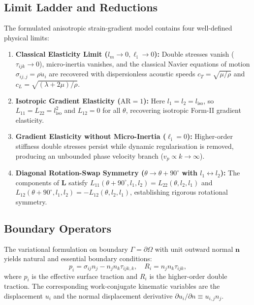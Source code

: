 \subsection{Limit Ladder and Reductions}
The formulated anisotropic strain-gradient model contains four well-defined physical limits:
\begin{enumerate}[label=(\roman*)]
  \item \textbf{Classical Elasticity Limit ($l_m \to 0, \ell_{\mathrm{i}} \to 0$):} Double stresses vanish ($\tau_{ijk} \to 0$), micro-inertia vanishes, and the classical Navier equations of motion $\sigma_{ij,j} = \rho \ddot u_i$ are recovered with dispersionless acoustic speeds $c_T = \sqrt{\mu/\rho}$ and $c_L = \sqrt{(\lambda+2\mu)/\rho}$.
  \item \textbf{Isotropic Gradient Elasticity ($\mathrm{AR} = 1$):} Here $l_1 = l_2 = l_{\mathrm{iso}}$, so $L_{11} = L_{22} = l_{\mathrm{iso}}^2$ and $L_{12} = 0$ for all $\theta$, recovering isotropic Form-II gradient elasticity.
  \item \textbf{Gradient Elasticity without Micro-Inertia ($\ell_{\mathrm{i}} = 0$):} Higher-order stiffness double stresses persist while dynamic regularisation is removed, producing an unbounded phase velocity branch ($v_p \propto k \to \infty$).
  \item \textbf{Diagonal Rotation-Swap Symmetry ($\theta \to \theta + 90^\circ$ with $l_1 \leftrightarrow l_2$):} The components of $\mathbf{L}$ satisfy $L_{11}(\theta+90^\circ, l_1, l_2) = L_{22}(\theta, l_2, l_1)$ and $L_{12}(\theta+90^\circ, l_1, l_2) = -L_{12}(\theta, l_2, l_1)$, establishing rigorous rotational symmetry.
\end{enumerate}

\subsection{Boundary Operators}
The variational formulation on boundary $\Gamma = \partial\Omega$ with unit outward normal $\bm n$ yields natural and essential boundary conditions:
\begin{equation}
p_i = \sigma_{ij}n_j - n_j n_k \tau_{ijk,k}, \quad R_i = n_j n_k \tau_{ijk},
\label{eq:traction_def}
\end{equation}
where $p_i$ is the effective surface traction and $R_i$ is the higher-order double traction. The corresponding work-conjugate kinematic variables are the displacement $u_i$ and the normal displacement derivative $\partial u_i/\partial n \equiv u_{i,j}n_j$.
